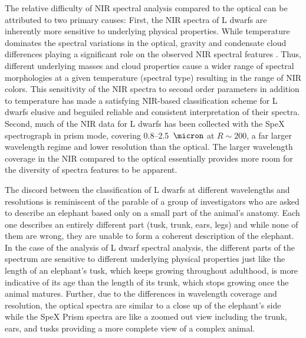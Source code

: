\documentclass[12pt,preprint]{aastex}
\begin{document}
The relative difficulty of NIR spectral analysis compared to the optical can be attributed to two primary causes:
First, the NIR spectra of L dwarfs are inherently more sensitive to underlying physical properties.
While temperature dominates the spectral variations in the optical, gravity and condensate cloud differences playing a significant role on the observed NIR spectral features \citep{Knapp04}.
Thus, different underlying masses and cloud properties cause a wider range of spectral morphologies at a given temperature (spectral type) resulting in the range of NIR colors. 
This sensitivity of the NIR spectra to second order parameters in addition to temperature has made a satisfying NIR-based classification scheme for L dwarfs elusive and beguiled reliable and consistent interpretation of their spectra.
Second, much of the NIR data for L dwarfs has been collected with the SpeX spectrograph in prism mode, covering 0.8--2.5~$\micron$ at $R\sim200$, a far larger wavelength regime and lower resolution than the optical.
The larger wavelength coverage in the NIR compared to the optical essentially provides more room for the diversity of spectra features to be apparent.

The discord between the classification of L dwarfs at different wavelengths and resolutions is reminiscent of the parable of a group of investigators who are asked to describe an elephant based only on a small part of the animal's anatomy. 
Each one describes an entirely different part (tusk, trunk, ears, legs) and while none of them are wrong, they are unable to form a coherent description of the elephant.
In the case of the analysis of L dwarf spectral analysis, the different parts of the spectrum are sensitive to different underlying physical properties just like the length of an elephant's tusk, which keeps growing throughout adulthood, is more indicative of its age than the length of its trunk, which stops growing once the animal matures. 
Further, due to the differences in wavelength coverage and resolution, the optical spectra are similar to a close up of the elephant's side while the SpeX Prism spectra are like a zoomed out view including the trunk, ears, and tusks providing a more complete view of a complex animal.

\end{document}

